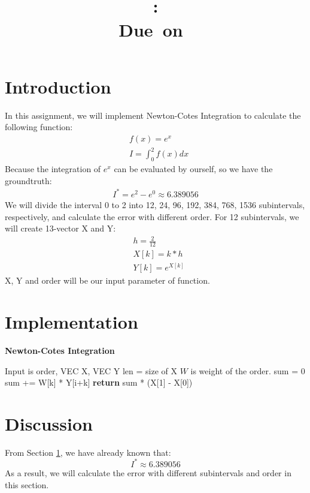\documentclass{article}
\title{
    \vspace{2in}
    \textmd{\textbf{\hmwkClass}}\\
    \textmd{\textbf{\hmwkID: \hmwkTitle}} \\
    \normalsize\vspace{0.1in}\small{Due\ on\ \hmwkDueDate}\\
    \vspace{3in}
}
\author{\textbf{\hmwkAuthorName}}
\date{} %
\begin{document}
\maketitle
\newpage

\section{Introduction}
\label{sec:intro}
In this assignment, we will implement Newton-Cotes Integration to calculate the following function:
\begin{align}
    & f(x) = e^x \\
    & I = \int_0^2f(x)dx
\end{align}
Because the integration of $e^x$ can be evaluated by ourself, so we have the groundtruth:
\begin{align}
    I^* = e^2 - e^0 \approx 6.389056
\end{align}
We will divide the interval 0 to 2 into 12, 24, 96, 192, 384, 768, 1536 subintervals, respectively, and calculate the error with different
order. For 12 subintervals, we will create 13-vector X and Y:
\begin{align*}
    & h = \frac{2}{12} \\
    & X[k] = k * h \\
    & Y[k] = e^{X[k]}
\end{align*}
X, Y and order will be our input parameter of function.

\section{Implementation}
\begin{algorithm}[H]
    \caption{\textbf{Newton-Cotes Integration}}
    \begin{algorithmic}
        \State Input is order, VEC X, VEC Y
        \State len = size of X
        \State $W$ is weight of the order.
        \State sum = 0
                \State sum += W[k] * Y[i+k]
            \EndFor
        \EndFor
        \State \textbf{return} sum * (X[1] - X[0])
    \end{algorithmic}
\end{algorithm}

\section{Discussion}
From Section \ref{sec:intro}, we have already known that:
$$
    I^* \approx 6.389056
$$
As a result, we will calculate the error with different subintervals and order in this section.
\end{document}
